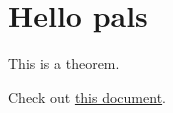 \documentclass[reqno]{amsart} 
\begin{document}
\section{Hello pals}


\begin{theorem}\label{theorem:d1bd91cb750b}
This is a theorem.
\end{theorem}

Check out \href{20230612T124951__i-dont-know-trial-okay.pdf}{this document}.

{} 
\end{document}
